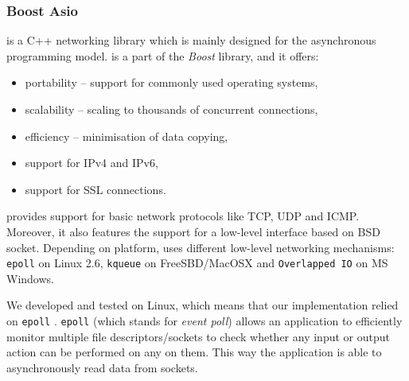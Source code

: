         \subsubsection{Boost Asio}
            \Asio\cite{Asio} is a C++ networking library which is mainly designed for the asynchronous programming model. \Asio is a part of the \textit{Boost} library, and it offers:
            \begin{itemize}
                \item portability -- support for commonly used operating systems,
                \item scalability -- scaling to thousands of concurrent connections,
                \item efficiency -- minimisation of data copying,
                \item support for IPv4 and IPv6,
                \item support for SSL connections.
            \end{itemize}
            \Asio provides support for basic network protocols like TCP, UDP and ICMP. Moreover, it also features the support for a low-level interface based on BSD socket. Depending on platform, \Asio uses different low-level networking mechanisms: \texttt{epoll} on Linux 2.6, \texttt{kqueue} on FreeSBD/MacOSX and \texttt{Overlapped IO} on MS Windows.
            
            We developed and tested \DHTS on Linux, which means that our implementation relied on \texttt{epoll} \cite{Epoll}. \texttt{epoll} (which stands for \emph{event poll}) allows an application to efficiently monitor multiple file descriptors/sockets to check whether any input or output action can be performed on any on them. This way the application is able to asynchronously read data from sockets.
